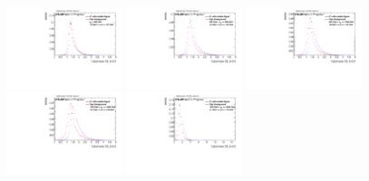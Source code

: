 \begin{figure}[H]
\bigskip
\includegraphics[width=0.3\textwidth]{sascha_input/Appendix/Distributions/higgs/distributions/beta05/h_recoJet_D2_05_bin1.pdf} \hspace{1mm}
\includegraphics[width=0.3\textwidth]{sascha_input/Appendix/Distributions/higgs/distributions/beta05/h_recoJet_D2_05_bin2.pdf} \hspace{4mm}
\includegraphics[width=0.3\textwidth]{sascha_input/Appendix/Distributions/higgs/distributions/beta05/h_recoJet_D2_05_bin3.pdf} 
\bigskip
\includegraphics[width=0.3\textwidth]{sascha_input/Appendix/Distributions/higgs/distributions/beta05/h_recoJet_D2_05_bin4.pdf} \hspace{4mm}
\includegraphics[width=0.3\textwidth]{sascha_input/Appendix/Distributions/higgs/distributions/beta05/h_recoJet_D2_05_bin5.pdf} 


\end{figure}
